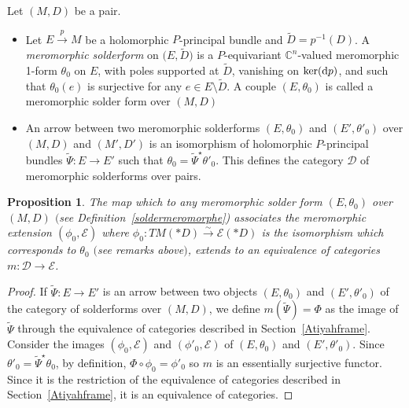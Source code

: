 \documentclass[pdftex]{sigma}
\numberwithin{equation}{section}
\newtheorem{Proposition}[Theorem]{Proposition}
 { \theoremstyle{definition}
\newtheorem{Definition}[Theorem]{Definition}
\newtheorem{Note}[Theorem]{Note}
\newtheorem{Exemple}[Theorem]{Example}
\newtheorem{Remark}[Theorem]{Remark} }
\begin{document}
\begin{Definition}\label{soldermeromorphe}Let $(M,D)$ be a pair.
\begin{itemize}\itemsep=0pt
\item[(1)] Let $E\overset{p}{\longrightarrow} M$ be a holomorphic $P$-principal bundle and $\tilde{D}=p^{-1}(D)$. A \textit{meromorphic solderform} on $\big(E,\tilde{D}\big)$ is a $P$-equivariant $\mathbb{C}^n$-valued meromorphic 1-form $\theta_0$ on $E$, with poles supported at $\tilde{D}$, vanishing on $\ker({\rm d}p)$, and such that $\theta_0(e)$ is surjective for any $e\in E\setminus \tilde{D}$. A couple $(E,\theta_0)$ is called a meromorphic solder form over $(M,D)$
\item[(2)] An arrow between two meromorphic solderforms $(E,\theta_0)$ and $(E',\theta'_0)$ over $(M,D)$ and $(M',D')$ is an isomorphism of holomorphic $P$-principal bundles $\tilde{\Psi}\colon E \longrightarrow E'$ such that $\theta_0 = \tilde{\Psi}^\star \theta'_0$. This defines the category $\mathcal{D}$ of meromorphic solderforms over pairs.
\end{itemize}
\end{Definition}

\begin{Proposition}\label{solderequivalence} The map which to any meromorphic solder form $(E,\theta_0)$ over $(M,D)$ $($see Definition~{\rm \ref{soldermeromorphe})} associates the meromorphic extension $(\phi_0,\mathcal{E})$ where $\phi_0\colon TM(* D) \overset{\sim}{\longrightarrow} \mathcal{E}(* D)$ is the isomorphism which corresponds to $\theta_0$ $($see remarks above$)$, extends to an equivalence of categories $m\colon \mathcal{D} \longrightarrow \mathcal{E}$.
 \end{Proposition}\begin{proof}
 If $\tilde{\Psi}\colon E \longrightarrow E'$ is an arrow between two objects $(E,\theta_0)$ and $(E',\theta'_0)$ of the category of solderforms over $(M,D)$, we define $m(\tilde{\Psi})=\Phi$ as the image of $\tilde{\Psi}$ through the equivalence of categories described in Section~\ref{Atiyahframe}. Consider the images $(\phi_0,\mathcal{E})$ and $(\phi'_0,\mathcal{E})$ of $(E,\theta_0)$ and $(E',\theta'_0)$. Since $\theta'_0 = \tilde{\Psi}^\star \theta_0$, by definition, $\Phi \circ \phi_0 = \phi'_0$ so $m$ is an essentially surjective functor. Since it is the restriction of the equivalence of categories described in Section~\ref{Atiyahframe}, it is an equivalence of categories.
\end{proof}
\end{document}

